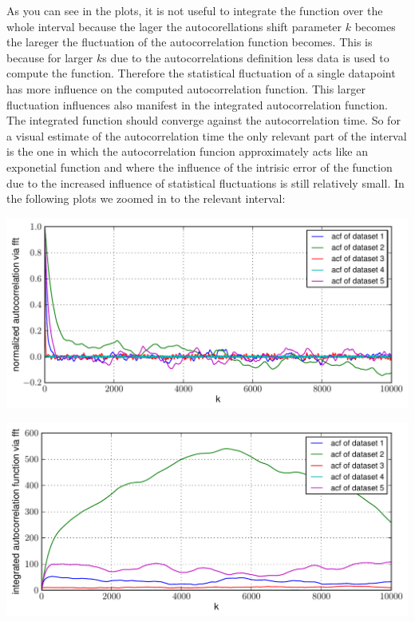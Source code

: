 \documentclass[12pt,a4paper]{scrartcl}
\begin{document}
As you can see in the plots, it is not useful to integrate the function over the whole interval because the lager the autocorellations shift parameter $k$ becomes the lareger the fluctuation of the autocorrelation function becomes. This is because for  larger $k$s due to the autocorrelations definition less data is used to compute the function. Therefore the statistical fluctuation of a single datapoint has more influence on the computed autocorrelation function. This larger fluctuation influences also manifest in the integrated autocorrelation function.
The integrated function should converge against the autocorrelation time. So for a visual estimate of the autocorrelation time the only relevant part of the interval is the one in which the autocorrelation funcion approximately acts like an exponetial function and where the influence of the intrisic error of the function due to the increased influence of statistical fluctuations is still relatively small. In the following plots we zoomed in to the relevant interval:

\begin{minipage}[hbt]{15cm}
	\centering
	\includegraphics[width=16cm]{../plots/acfzoom.pdf}
\end{minipage}

\begin{minipage}[hbt]{15cm}
	\centering
	\includegraphics[width=16cm]{../plots/acfintzoom.pdf}
\end{minipage}
\end{document}
